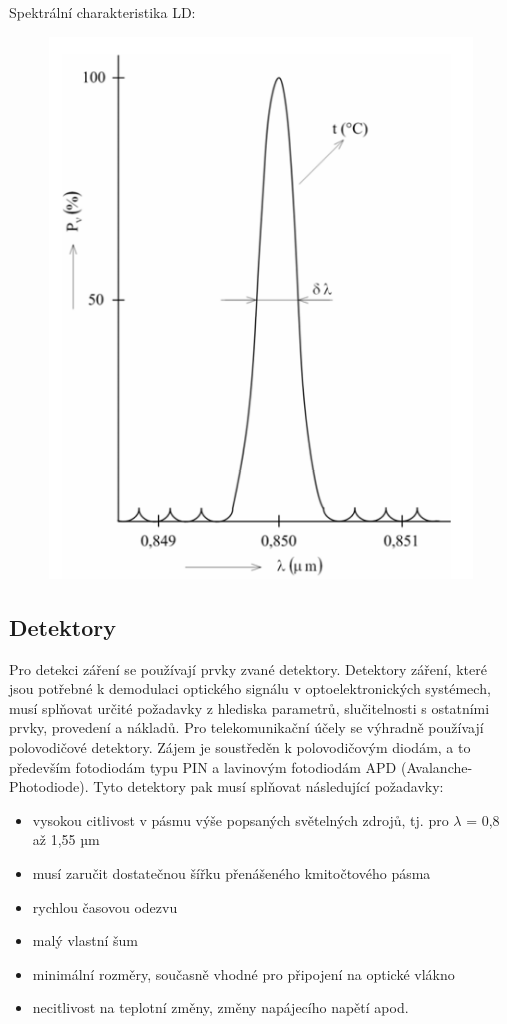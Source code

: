 Spektrální charakteristika LD:

\begin{figure}[!ht]
\begin{center}
    \includegraphics[scale=0.6]{obrazky/spektrLD.png}
  \end{center}
\end{figure}

\subsection{Detektory}
Pro detekci záření se používají prvky zvané detektory. Detektory záření, které jsou potřebné k demodulaci optického signálu v optoelektronických systémech, musí splňovat určité požadavky z hlediska parametrů, slučitelnosti s ostatními prvky, provedení a nákladů. Pro telekomunikační účely se výhradně používají polovodičové detektory. Zájem je soustředěn k polovodičovým diodám, a to především fotodiodám typu PIN a lavinovým fotodiodám APD (Avalanche-Photodiode). Tyto detektory pak musí splňovat následující požadavky:
\begin{itemize}
    \item vysokou citlivost v pásmu výše popsaných světelných zdrojů, tj. pro $\lambda$ = 0,8 až 1,55 µm
    \item musí zaručit dostatečnou šířku přenášeného kmitočtového pásma
    \item rychlou časovou odezvu
    \item malý vlastní šum
    \item minimální rozměry, současně vhodné pro připojení na optické vlákno
    \item necitlivost na teplotní změny, změny napájecího napětí apod.
\end{itemize}

